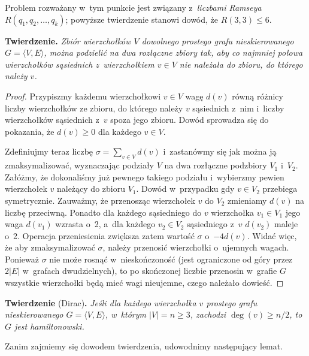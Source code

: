 Problem rozważany w~tym punkcie jest związany z~\emph{liczbami Ramseya} $R(q_1,q_2,\dots,q_k)$; powyższe twierdzenie stanowi dowód, że $R(3,3)\le6$.

\subproblem %
\textsf{\textbf{Twierdzenie.}} \textit{Zbiór wierzchołków\/ $V$ dowolnego prostego grafu nieskierowanego\/ $G=\langle V,E\rangle$, można podzielić na dwa rozłączne zbiory tak, aby co najmniej połowa wierzchołków sąsiednich z~wierzchołkiem\/ $v\in V$ nie należała do zbioru, do którego należy\/ $v$.}
\begin{proof}
Przypiszmy każdemu wierzchołkowi $v\in V$ wagę $d(v)$ równą różnicy liczby wierzchołków ze zbioru, do którego należy $v$ sąsiednich z~nim i~liczby wierzchołków sąsiednich z~$v$ spoza jego zbioru. Dowód sprowadza się do pokazania, że $d(v)\ge0$ dla każdego $v\in V$\!.

Zdefiniujmy teraz liczbę $\sigma=\sum_{v\in V}d(v)$ i~zastanówmy się jak można ją zmaksymalizować, wyznaczając podziały $V$ na dwa rozłączne podzbiory $V_1$ i~$V_2$. Załóżmy, że dokonaliśmy już pewnego takiego podziału i~wybierzmy pewien wierzchołek $v$ należący do zbioru $V_1$. Dowód w~przypadku gdy $v\in V_2$ przebiega symetrycznie. Zauważmy, że przenosząc wierzchołek $v$ do $V_2$ zmieniamy $d(v)$ na liczbę przeciwną. Ponadto dla każdego sąsiedniego do $v$ wierzchołka $v_1\in V_1$ jego waga $d(v_1)$ wzrasta o~2, a~dla każdego $v_2\in V_2$ sąsiedniego z~$v$ $d(v_2)$ maleje o~2. Operacja przeniesienia zwiększa zatem wartość $\sigma$ o~$-4d(v)$. Widać więc, że aby zmaksymalizować $\sigma$, należy przenosić wierzchołki o~ujemnych wagach. Ponieważ $\sigma$ nie może rosnąć w~nieskończoność (jest ograniczone od góry przez $2|E|$ w~grafach dwudzielnych), to po skończonej liczbie przenosin w~grafie $G$ wszystkie wierzchołki będą mieć wagi nieujemne, czego należało dowieść.
\end{proof}

\subproblem %
\textsf{\textbf{Twierdzenie} (Dirac)\textbf{.}} \textit{Jeśli dla każdego wierzchołka\/ $v$ prostego grafu nieskierowanego\/ $G=\langle V,E\rangle$, w~którym\/ $|V|=n\ge3$, zachodzi\/ $\deg(v)\ge n/2$, to\/ $G$ jest hamiltonowski.}

\medskip
\noindent Zanim zajmiemy się dowodem twierdzenia, udowodnimy następujący lemat.

